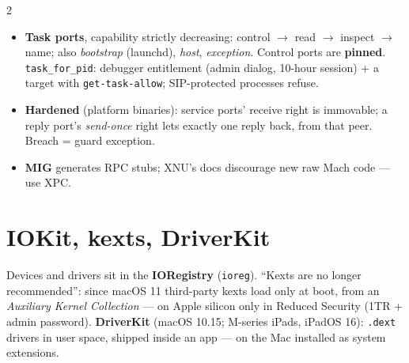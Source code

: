 \documentclass[8pt]{extarticle}
\newcommand\ct[1]{\texttt{#1}}
\begin{document}
\begin{multicols}{2}
\noindent{}
\begin{itemize}
  \item \textbf{Task ports}, capability strictly decreasing: control $\to$ read $\to$ inspect $\to$
        name; also \emph{bootstrap} (launchd), \emph{host}, \emph{exception}. Control ports are
        \textbf{pinned}. \ct{task\_for\_pid}: debugger entitlement (admin dialog, 10-hour session)
        + a target with \ct{get-task-allow}; SIP-protected processes refuse.
  \item \textbf{Hardened} (platform binaries): service ports' receive right is immovable; a reply
        port's \emph{send-once} right lets exactly one reply back, from that peer. Breach = guard
        exception.
  \item \textbf{MIG} generates RPC stubs; XNU's docs discourage new raw Mach code — use XPC.
\end{itemize}

\section{IOKit, kexts, DriverKit}
Devices and drivers sit in the \textbf{IORegistry} (\ct{ioreg}). ``Kexts are no longer
recommended'': since macOS 11 third-party kexts load only at boot, from an \emph{Auxiliary Kernel
Collection} — on Apple silicon only in Reduced Security (1TR + admin password). \textbf{DriverKit}
(macOS 10.15; M-series iPads, iPadOS 16): \ct{.dext} drivers in user space, shipped inside an
app — on the Mac installed as system extensions.


\end{multicols}
\end{document}
